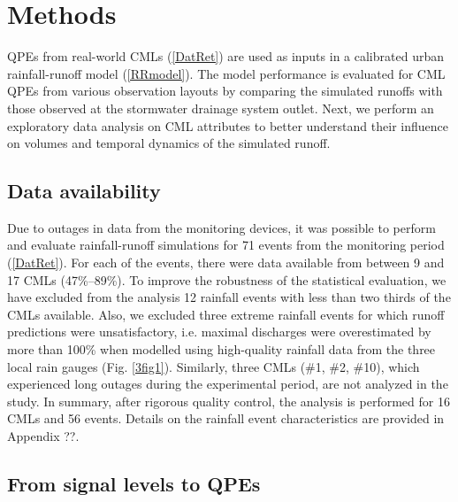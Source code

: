 \documentclass{ctuthesis}\usepackage[]{graphicx}\usepackage[]{color}
\begin{document}
 
\section{Methods} \label{paperIMnM}

QPEs from real-world CMLs (\ref{DatRet}) are used as inputs in a calibrated urban rainfall-runoff model (\ref{RRmodel}). The model performance is evaluated for CML QPEs from various observation layouts by comparing the simulated runoffs with those observed at the stormwater drainage system outlet. Next, we perform an exploratory data analysis on CML attributes to better understand their influence on volumes and temporal dynamics of the simulated runoff. 


\subsection{Data availability} \label{paperIIdatAval}

Due to outages in data from the monitoring devices, it was possible to perform and evaluate rainfall-runoff simulations for 71 events from the monitoring period (\ref{DatRet}). For each of the events, there were data available from between 9 and 17 CMLs (47\%--89\%). To improve the robustness of the statistical evaluation, we have excluded from the analysis 12 rainfall events with less than two thirds of the CMLs available. Also, we excluded three extreme rainfall events for which runoff predictions were unsatisfactory, i.e. maximal discharges were overestimated by more than 100\% when modelled using high-quality rainfall data from the three local rain gauges (Fig. \ref{3fig1}). Similarly, three CMLs (\#1, \#2, \#10), which experienced long outages during the experimental period, are not analyzed in the study. In summary, after rigorous quality control, the analysis is performed for 16 CMLs and 56 events. Details on the rainfall event characteristics are provided in Appendix ??.


\subsection{From signal levels to QPEs} \label{DerCML}
\end{document}
